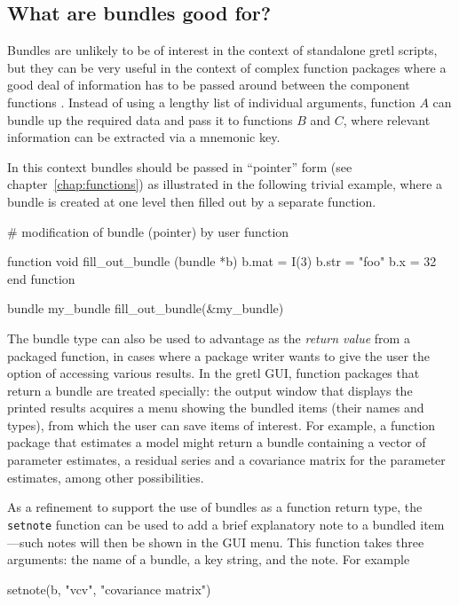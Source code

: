\subsection{What are bundles good for?}

Bundles are unlikely to be of interest in the context of standalone
gretl scripts, but they can be very useful in the context of complex
function packages where a good deal of information has to be passed
around between the component functions \citep[see][]{GFPG}. Instead of
using a lengthy list of individual arguments, function $A$ can bundle
up the required data and pass it to functions $B$ and $C$, where
relevant information can be extracted via a mnemonic key.

In this context bundles should be passed in ``pointer'' form
(see chapter~\ref{chap:functions}) as illustrated in the following
trivial example, where a bundle is created at one level then filled
out by a separate function.

\begin{code}
# modification of bundle (pointer) by user function

function void fill_out_bundle (bundle *b)
  b.mat =  I(3)
  b.str = "foo"
  b.x = 32
end function

bundle my_bundle 
fill_out_bundle(&my_bundle)
\end{code}

The bundle type can also be used to advantage as the \textit{return
  value} from a packaged function, in cases where a package writer
wants to give the user the option of accessing various results. In the
gretl GUI, function packages that return a bundle are treated
specially: the output window that displays the printed results
acquires a menu showing the bundled items (their names and types),
from which the user can save items of interest. For example, a
function package that estimates a model might return a bundle 
containing a vector of parameter estimates, a residual series and a
covariance matrix for the parameter estimates, among other
possibilities.

As a refinement to support the use of bundles as a function return
type, the \texttt{setnote} function can be used to add a brief
explanatory note to a bundled item---such notes will then be shown in
the GUI menu.  This function takes three arguments: the name of a
bundle, a key string, and the note. For example

\begin{code}
setnote(b, "vcv", "covariance matrix")
\end{code}

